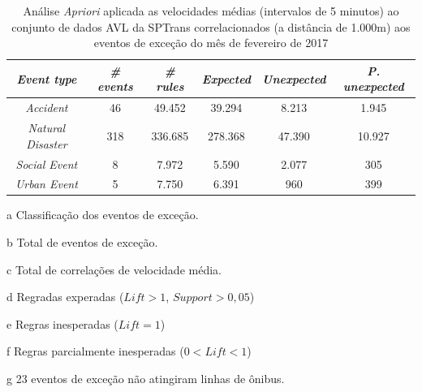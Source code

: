 \documentclass[
	12pt,				%
	oneside,			%
	a4paper,			%
	english,			%
	brazil				%
	]{abntex2ppgsi}
\begin{document}
\begin{apendicesenv}
\begin{table}[!htb]
\centering
\begin{threeparttable}
\caption {Análise \textit{Apriori} aplicada as velocidades médias (intervalos de 5 minutos) ao conjunto de dados AVL da SPTrans correlacionados (a distância de 1.000m) aos eventos de exceção do mês de fevereiro de 2017}
\label {tab:aprioriFull}
\begin{tabular}{c|c|c|c|c|c}
\hline
\textbf{\textit{Event type}}\tnote{a} & \textbf{\textit{\# events}}\tnote{b} & \textit{\textbf{\# rules}}\tnote{c} & \textbf{\textit{Expected}}\tnote{d} & \textbf{\textit{Unexpected}}\tnote{e} & \textbf{\textit{P. unexpected}}\tnote{f}   \\
\hline
\textit{Accident} & 46 & 49.452 & 39.294 & 8.213 & 1.945 \\
\textit{Natural Disaster} & 318 & 336.685 & 278.368 & 47.390 & 10.927 \\
\textit{Social Event} & 8 & 7.972 & 5.590 & 2.077 & 305 \\
\textit{Urban Event} & 5 & 7.750 & 6.391 & 960 & 399 \\
\hline
\end{tabular}
\begin{tablenotes}
            \item[a] Classificação dos eventos de exceção.
            \item[b] Total de eventos de exceção.
            \item[c] Total de correlações de velocidade média.
            \item[d] Regradas experadas ($Lift > 1$, $Support > 0,05$)
            \item[e] Regras inesperadas ($Lift = 1$)
            \item[f] Regras parcialmente inesperadas ($0 < Lift < 1$)
            \item[g] 23 eventos de exceção não atingiram linhas de ônibus.
        \end{tablenotes}
\end{threeparttable}
\end{table}


\end{apendicesenv}
\end{document}
